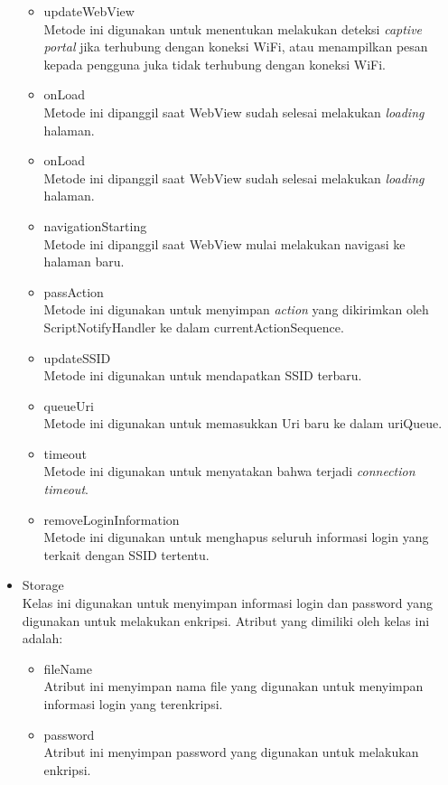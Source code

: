 \begin{itemize}
{\begin{itemize}
            \item{updateWebView\\Metode ini digunakan untuk menentukan melakukan deteksi \textit{captive portal} jika terhubung dengan koneksi WiFi, atau menampilkan pesan kepada pengguna juka tidak terhubung dengan koneksi WiFi.}
            \item{onLoad\\Metode ini dipanggil saat WebView sudah selesai melakukan \textit{loading} halaman.}
            \item{onLoad\\Metode ini dipanggil saat WebView sudah selesai melakukan \textit{loading} halaman.}
            \item{navigationStarting\\Metode ini dipanggil saat WebView mulai melakukan navigasi ke halaman baru.}
            \item{passAction\\Metode ini digunakan untuk menyimpan \textit{action} yang dikirimkan oleh ScriptNotifyHandler ke dalam currentActionSequence.}
            \item{updateSSID\\Metode ini digunakan untuk mendapatkan SSID terbaru.}
            \item{queueUri\\Metode ini digunakan untuk memasukkan Uri baru ke dalam uriQueue.}
            \item{timeout\\Metode ini digunakan untuk menyatakan bahwa terjadi \textit{connection timeout}.}
            \item{removeLoginInformation\\Metode ini digunakan untuk menghapus seluruh informasi login yang terkait dengan SSID tertentu.}
        \end{itemize}
    }
    \item{
        Storage\\Kelas ini digunakan untuk menyimpan informasi login dan password yang digunakan untuk melakukan enkripsi. Atribut yang dimiliki oleh kelas ini adalah:
        \begin{itemize}
            \item{fileName\\Atribut ini menyimpan nama file yang digunakan untuk menyimpan informasi login yang terenkripsi.}
            \item{password\\Atribut ini menyimpan password yang digunakan untuk melakukan enkripsi.}

\end{itemize}}
\end{itemize}
